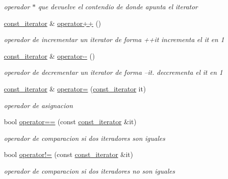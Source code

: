 \begin{DoxyCompactItemize}
\begin{DoxyCompactList}\small\item\em operador $\ast$ que devuelve el contendio de donde apunta el iterator \end{DoxyCompactList}\item 
\hypertarget{classAVL_1_1const__iterator_a1eee1c8c9b4e34798a739f1b639b1464}{\hyperlink{classAVL_1_1const__iterator}{const\-\_\-iterator} \& \hyperlink{classAVL_1_1const__iterator_a1eee1c8c9b4e34798a739f1b639b1464}{operator++} ()}\label{classAVL_1_1const__iterator_a1eee1c8c9b4e34798a739f1b639b1464}

\begin{DoxyCompactList}\small\item\em operador de incrementar un iterator de forma ++it incrementa el it en 1 \end{DoxyCompactList}\item 
\hypertarget{classAVL_1_1const__iterator_a43be0c0ac5e9aa4db4e49192b6b7e81e}{\hyperlink{classAVL_1_1const__iterator}{const\-\_\-iterator} \& \hyperlink{classAVL_1_1const__iterator_a43be0c0ac5e9aa4db4e49192b6b7e81e}{operator-\/-\/} ()}\label{classAVL_1_1const__iterator_a43be0c0ac5e9aa4db4e49192b6b7e81e}

\begin{DoxyCompactList}\small\item\em operador de decrementar un iterator de forma --it. deccrementa el it en 1 \end{DoxyCompactList}\item 
\hyperlink{classAVL_1_1const__iterator}{const\-\_\-iterator} \& \hyperlink{classAVL_1_1const__iterator_a9b28b5dd796f96ab6cbfe8ee0a2230d6}{operator=} (\hyperlink{classAVL_1_1const__iterator}{const\-\_\-iterator} it)
\begin{DoxyCompactList}\small\item\em operador de asignacion \end{DoxyCompactList}\item 
bool \hyperlink{classAVL_1_1const__iterator_a4eee292cc6d74483a20bbff08f69c5ea}{operator==} (const \hyperlink{classAVL_1_1const__iterator}{const\-\_\-iterator} \&it)
\begin{DoxyCompactList}\small\item\em operador de comparacion si dos iteradores son iguales \end{DoxyCompactList}\item 
bool \hyperlink{classAVL_1_1const__iterator_a20852d4a8c04f2fdd0eb759e7691efdd}{operator!=} (const \hyperlink{classAVL_1_1const__iterator}{const\-\_\-iterator} \&it)
\begin{DoxyCompactList}\small\item\em operador de comparacion si dos iteradores no son iguales \end{DoxyCompactList}\end{DoxyCompactItemize}
